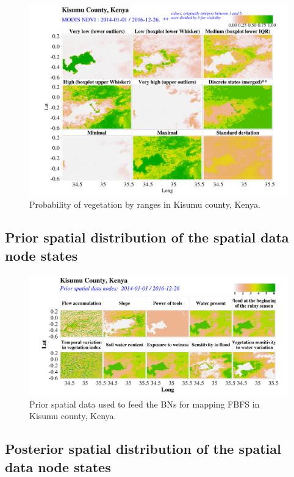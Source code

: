 \documentclass[12pt,oneside]{article}
\begin{document}
\begin{figure}
\includegraphics[width=1\linewidth]{figures/Mapping_FBFS_vegetation_probability} \caption{Probability of vegetation by ranges in Kisumu county, Kenya.}\label{fig:fig10}
\end{figure}

\hypertarget{II4}{%
\subsection{Prior spatial distribution of the spatial data node states}\label{II4}}

\begin{figure}
\includegraphics[width=1\linewidth]{figures/Mapping_FBFS_prior_maps} \caption{Prior spatial data used to feed the BNs for mapping FBFS in Kisumu county, Kenya.}\label{fig:fig11}
\end{figure}

\hypertarget{II5}{%
\subsection{Posterior spatial distribution of the spatial data node states}\label{II5}}
\end{document}
